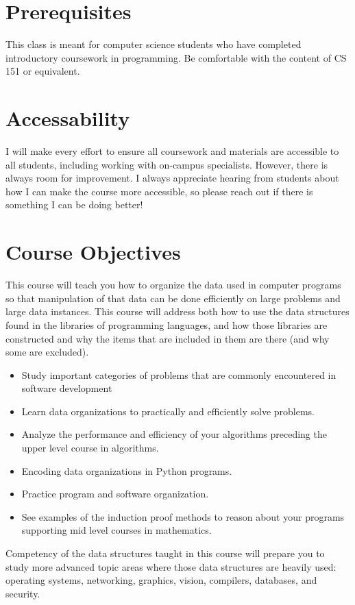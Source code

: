 \documentclass[11pt]{article}
\begin{document}

\section*{Prerequisites}

This class is meant for computer science students who have completed introductory coursework in programming. Be comfortable with the content of CS 151 or equivalent.
\section*{Accessability}

I will make every effort to ensure all coursework and materials are accessible to all students, including working with on-campus specialists. However, there is always room for improvement. I always appreciate hearing from students about how I can make the course more accessible, so please reach out if there is something I can be doing better!


\section*{Course Objectives}
This course will teach you how to organize the data used in computer programs so that manipulation of that data can be done efficiently on large problems and large data instances.  This course will address both how to use the data structures found in the libraries of programming languages, and how those libraries are constructed and why the items that are included in them are there (and why some are excluded). 
\begin{itemize}
\item Study important categories of problems that are commonly encountered in software development
\item Learn data organizations to practically and efficiently solve problems. 
\item Analyze the performance and efficiency of your algorithms preceding the upper level course in algorithms. 
\item Encoding data organizations in Python programs. 
\item Practice program and software organization.
\item See examples of the induction proof methods to reason about your programs supporting mid level courses in mathematics.  
\end{itemize}
Competency of the data structures taught in this course will prepare you to study more advanced topic areas where those data structures are heavily used: operating systems, networking, graphics, vision, compilers, databases, and security.
\end{document}
